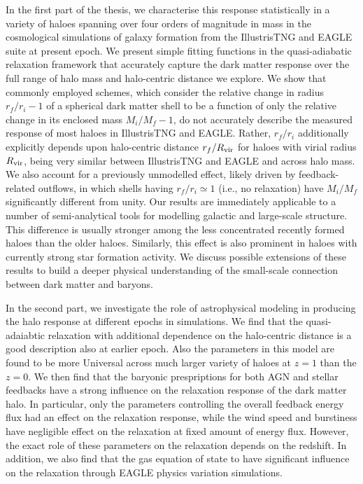 \documentclass[a4paper, 12pt, oneside]{Thesis}  %
\begin{document}
{In the first part of the thesis, we characterise this response statistically in a variety of haloes spanning over four orders of magnitude in mass in the cosmological simulations of galaxy formation from the IllustrisTNG and EAGLE suite at present epoch. We present simple fitting functions in the quasi-adiabatic relaxation framework that accurately capture the dark matter response over the full range of halo mass and halo-centric distance we explore. We show that commonly employed schemes, which consider the relative change in radius $r_f/r_i-1$ of a spherical dark matter shell to be a function of only the relative change in its enclosed mass $M_i/M_f-1$, do not accurately describe the measured response of most haloes in IllustrisTNG and EAGLE. Rather, $r_f/r_i$ additionally explicitly depends upon halo-centric distance $r_f/R_{\rm vir}$ for haloes with virial radius $R_{\rm vir}$, being very similar between IllustrisTNG and EAGLE and across halo mass. We also account for a previously unmodelled effect, likely driven by feedback-related outflows, in which shells having $r_f/r_i\simeq1$ (i.e., no relaxation) have $M_i/M_f$ significantly different from unity. Our results are immediately applicable to a number of semi-analytical tools for modelling galactic and large-scale structure. This difference is usually stronger among the less concentrated recently formed haloes than the older haloes. Similarly, this effect is also prominent in haloes with currently strong star formation activity. We discuss possible extensions of these results to build a deeper physical understanding of the small-scale connection between dark matter and baryons.

In the second part, we investigate the role of astrophysical modeling in producing the halo response at different epochs in simulations. We find that the quasi-adaiabtic relaxation with additional dependence on the halo-centric distance is a good description also at earlier epoch. Also the parameters in this model are found to be more Universal across much larger variety of haloes at \(z=1\) than the \(z=0\). We then find that the baryonic prespriptions for both AGN and stellar feedbacks have a strong influence on the relaxation response of the dark matter halo. In particular, only the parameters controlling the overall feedback energy flux had an effect on the relaxation response, while the wind speed and burstiness have negligible effect on the relaxation at fixed amount of energy flux. However, the exact role of these parameters on the relaxation depends on the redshift. In addition, we also find that the gas equation of state to have significant influence on the relaxation through EAGLE physics variation simulations.

}
\end{document}
